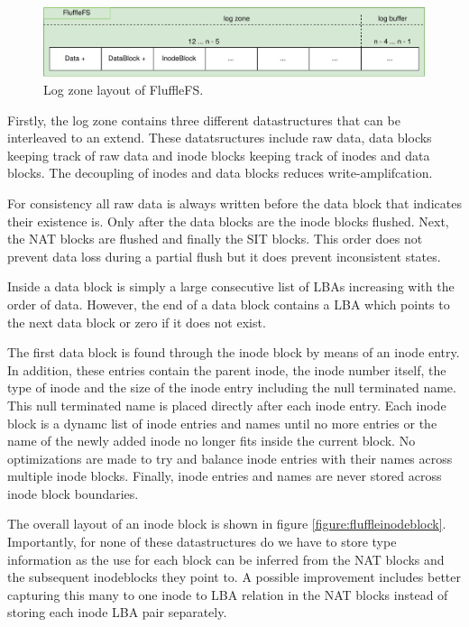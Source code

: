 \begin{figure}[h!]
    \centering
	\includegraphics[width=1\textwidth]{resources/images/fluffle-layout-log.pdf}
	\caption{Log zone layout of FluffleFS.}
    \label{figure:flufflelayoutlog}
\end{figure}

Firstly, the log zone contains three different datastructures that can be
interleaved to an extend. These datatsructures include raw data, data blocks
keeping track of raw data and inode blocks keeping track of inodes and data
blocks. The decoupling of inodes and data blocks reduces write-amplifcation.

For consistency all raw data is always written before the data block that
indicates their existence is. Only after the data blocks are the inode blocks
flushed. Next, the NAT blocks are flushed and finally the SIT blocks. This order
does not prevent data loss during a partial flush but it does prevent
inconsistent states.

Inside a data block is simply a large consecutive list of LBAs increasing
with the order of data. However, the end of a data block contains a LBA which
points to the next data block or zero if it does not exist.

The first data block is found through the inode block by means of an inode
entry. In addition, these entries contain the parent inode, the inode number
itself, the type of inode and the size of the inode entry including the null
terminated name. This null terminated name is placed directly after each
inode entry. Each inode block is a dynamc list of inode entries and names
until no more entries or the name of the newly added inode no longer fits
inside the current block. No optimizations are made to try and balance inode
entries with their names across multiple inode blocks. Finally, inode entries
and names are never stored across inode block boundaries.

The overall layout of an inode block is shown in figure
\ref{figure:fluffleinodeblock}. Importantly, for none of these datastructures
do we have to store type information as the use for each block can be inferred
from the NAT blocks and the subsequent inodeblocks they point to.
A possible improvement includes better capturing this many to one inode to LBA
relation in the NAT blocks instead of storing each inode LBA pair separately.

